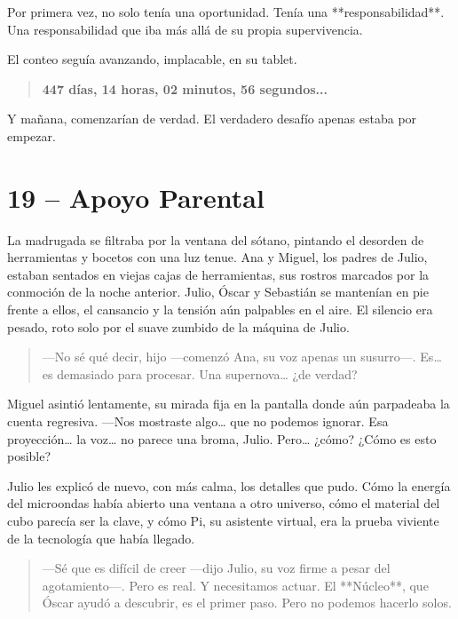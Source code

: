 \documentclass[a4paper,12pt]{book}
\begin{document}
Por primera vez, no solo tenía una oportunidad. Tenía una **responsabilidad**. Una responsabilidad que iba más allá de su propia supervivencia.

El conteo seguía avanzando, implacable, en su tablet.

\begin{quote}
    \textbf{447 días, 14 horas, 02 minutos, 56 segundos...}
\end{quote}

Y mañana, comenzarían de verdad. El verdadero desafío apenas estaba por empezar.

\cleardoublepage %

\chapter*{19 – Apoyo Parental}

La madrugada se filtraba por la ventana del sótano, pintando el desorden de herramientas y bocetos con una luz tenue. Ana y Miguel, los padres de Julio, estaban sentados en viejas cajas de herramientas, sus rostros marcados por la conmoción de la noche anterior. Julio, Óscar y Sebastián se mantenían en pie frente a ellos, el cansancio y la tensión aún palpables en el aire. El silencio era pesado, roto solo por el suave zumbido de la máquina de Julio.

\begin{quote}
    —No sé qué decir, hijo —comenzó Ana, su voz apenas un susurro—. Es… es demasiado para procesar. Una supernova… ¿de verdad?
\end{quote}

Miguel asintió lentamente, su mirada fija en la pantalla donde aún parpadeaba la cuenta regresiva. —Nos mostraste algo… que no podemos ignorar. Esa proyección… la voz… no parece una broma, Julio. Pero… ¿cómo? ¿Cómo es esto posible?

Julio les explicó de nuevo, con más calma, los detalles que pudo. Cómo la energía del microondas había abierto una ventana a otro universo, cómo el material del cubo parecía ser la clave, y cómo Pi, su asistente virtual, era la prueba viviente de la tecnología que había llegado.

\begin{quote}
    —Sé que es difícil de creer —dijo Julio, su voz firme a pesar del agotamiento—. Pero es real. Y necesitamos actuar. El **Núcleo**, que Óscar ayudó a descubrir, es el primer paso. Pero no podemos hacerlo solos.
\end{quote}
\end{document}
